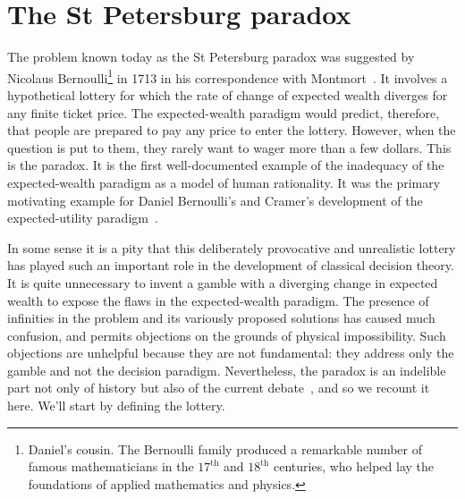 %
%

\section{The St Petersburg paradox}
The problem known today as the St Petersburg paradox was suggested by Nicolaus 
Bernoulli\footnote{Daniel's cousin. The Bernoulli family produced a remarkable 
number of famous mathematicians in the $17^\text{th}$ and $18^\text{th}$ centuries, 
who helped lay the foundations of applied mathematics and physics.} in 1713 in his 
correspondence with Montmort~\cite{Montmort1713}. It involves a hypothetical 
lottery for which the rate of change of expected wealth diverges for any finite ticket 
price. The expected-wealth paradigm would predict, therefore, that people are 
prepared to pay any price to enter the lottery. However, when the question is put 
to them, they rarely want to wager more than a few dollars. This 
is the paradox. It is the first well-documented example of the inadequacy of the 
expected-wealth paradigm as a model of human rationality. It was the primary 
motivating example for Daniel Bernoulli's and Cramer's development of the 
expected-utility paradigm~\cite{Bernoulli1738}.

In some sense it is a pity that this deliberately provocative and unrealistic lottery has played such an important role in the development of classical decision theory. It is quite unnecessary to invent a gamble with a diverging change in expected wealth to expose the flaws in the expected-wealth paradigm. The presence of infinities in the problem and its variously proposed solutions has caused much confusion, and permits objections on the grounds of physical impossibility. Such objections are unhelpful because they are not fundamental: they address only the gamble and not the decision paradigm. Nevertheless, the paradox is an indelible part not only of history but also of the current debate~\cite{Peters2011b}, and so we recount it here. We'll start by defining the lottery.

